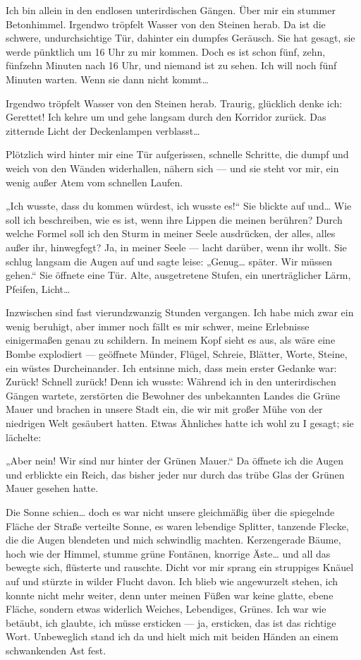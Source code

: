 Ich bin allein in den endlosen unterirdischen Gängen. Über mir ein
stummer Betonhimmel. Irgendwo tröpfelt Wasser von den Steinen
herab. Da ist die schwere, undurchsichtige Tür, dahinter ein
dumpfes Geräusch. Sie hat gesagt, sie werde pünktlich um 16 Uhr zu
mir kommen. Doch es ist schon fünf, zehn, fünfzehn Minuten nach 16
Uhr, und niemand ist zu sehen. Ich will noch fünf Minuten warten.
Wenn sie dann nicht kommt\ldots{}

Irgendwo tröpfelt Wasser von den Steinen herab. Traurig, glücklich
denke ich: Gerettet! Ich kehre um und gehe langsam durch den
Korridor zurück. Das zitternde Licht der Deckenlampen verblasst\ldots{}

Plötzlich wird hinter mir eine Tür aufgerissen, schnelle Schritte,
die dumpf und weich von den Wänden widerhallen, nähern sich — und
sie steht vor mir, ein wenig außer Atem vom schnellen Laufen.

„Ich wusste, dass du kommen würdest, ich wusste es!“ Sie blickte
auf und\ldots{} Wie soll ich beschreiben, wie es ist, wenn ihre Lippen
die meinen berühren? Durch welche Formel soll ich den Sturm in
meiner Seele ausdrücken, der alles, alles außer ihr, hinwegfegt?
Ja, in meiner Seele — lacht darüber, wenn ihr wollt. Sie schlug
langsam die Augen auf und sagte leise: „Genug\ldots{} später. Wir müssen
gehen.“ Sie öffnete eine Tür. Alte, ausgetretene Stufen, ein
unerträglicher Lärm, Pfeifen, Licht\ldots{}

Inzwischen sind fast vierundzwanzig Stunden vergangen. Ich habe
mich zwar ein wenig beruhigt, aber immer noch
fällt es mir schwer, meine Erlebnisse einigermaßen genau zu
schildern. In meinem Kopf sieht es aus, als wäre eine Bombe
explodiert — geöffnete Münder, Flügel, Schreie, Blätter, Worte,
Steine, ein wüstes Durcheinander. Ich entsinne mich, dass mein
erster Gedanke war: Zurück! Schnell zurück! Denn ich wusste:
Während ich in den unterirdischen Gängen wartete, zerstörten die
Bewohner des unbekannten Landes die Grüne Mauer und brachen in
unsere Stadt ein, die wir mit großer Mühe von der niedrigen Welt
gesäubert hatten. Etwas Ähnliches hatte ich wohl zu I gesagt; sie
lächelte:

„Aber nein! Wir sind nur hinter der Grünen Mauer.“ Da öffnete ich
die Augen und erblickte ein Reich, das bisher jeder nur durch das
trübe Glas der Grünen Mauer gesehen hatte.

Die Sonne schien\ldots{} doch es war nicht unsere gleichmäßig über die
spiegelnde Fläche der Straße verteilte Sonne, es waren lebendige
Splitter, tanzende Flecke, die die Augen blendeten und mich
schwindlig machten. Kerzengerade Bäume, hoch wie der Himmel, stumme
grüne Fontänen, knorrige Äste\ldots{} und all das bewegte sich,
flüsterte und rauschte. Dicht vor mir sprang ein struppiges Knäuel
auf und stürzte in wilder Flucht davon. Ich blieb wie angewurzelt
stehen, ich konnte nicht mehr weiter, denn unter meinen Füßen war
keine glatte, ebene Fläche, sondern etwas widerlich Weiches,
Lebendiges, Grünes. Ich war wie betäubt, ich glaubte, ich müsse
ersticken — ja, ersticken, das ist das richtige Wort. Unbeweglich
stand ich da und hielt mich mit beiden Händen an einem schwankenden
Ast fest.

